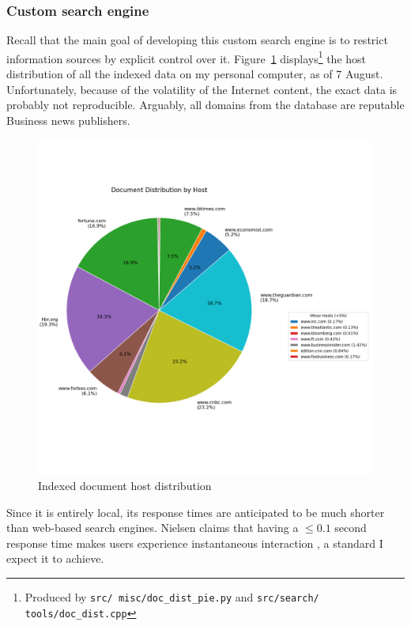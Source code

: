 \documentclass[final-report]{report-template}
\newcommand\ttb{\discretionary{}{}{}}
\begin{document}
\subsubsection{Custom search engine}
Recall that the main goal of developing this custom search engine is to
restrict information sources by explicit control over it.
Figure~\ref{fig.index.host.dist} displays\footnote{Produced by \texttt{src/\ttb
	misc/\ttb doc\_\ttb dist\_\ttb pie.py} and \texttt{src/\ttb search/\ttb
tools/\ttb doc\_\ttb dist.cpp}} the host distribution of all the indexed data
on my personal computer, as of 7 August. Unfortunately, because of the
volatility of the Internet content, the exact data is probably not
reproducible. Arguably, all domains from the database are reputable Business
news publishers.
\begin{figure}[hbtp!]
	\centering
	\includegraphics[height=.35\textheight]{res/doc_host_dist.png}
	\caption{Indexed document host distribution}
	\label{fig.index.host.dist}
\end{figure}

Since it is entirely local, its response times are anticipated to be much
shorter than web-based search engines. Nielsen claims that having a $\le 0.1$
second response time makes users experience instantaneous interaction
\cite[Chapter~5]{usability.eng}, a standard I expect it to achieve.
\end{document}

